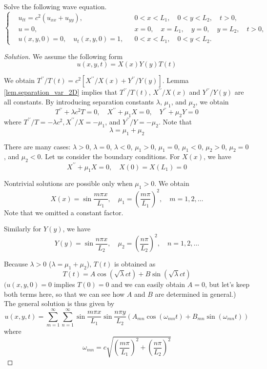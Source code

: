\begin{example}[]
Solve the following wave equation.
$$
\left\{\begin{aligned}
&u_{t t}=c^2\left(u_{x x}+u_{y y}\right), && 0<x<L_1, \quad 0<y<L_2, \quad t>0, 
\\
&u=0, && x=0, \quad x=L_1, \quad y=0, \quad y=L_2, \quad t>0, 
\\
&u(x, y, 0)=0, \quad u_t(x, y, 0)=1, && 0<x<L_1, \quad 0<y<L_2 .
\end{aligned}\right.
$$
\end{example}
\begin{proof}[Solution]
We assume the following form
$$
u(x, y, t)=X(x) Y(y) T(t)
$$

We obtain $T^{\prime \prime} / T(t)=c^2\left[X^{\prime \prime} / X(x)+Y^{\prime \prime} / Y(y)\right]$. Lemma \ref{lem.separation_var_2D} implies that $T^{\prime \prime} / T(t)$, $X^{\prime \prime} / X(x)$ and $Y^{\prime \prime} / Y(y)$ are all constants. By introducing separation constants $\lambda$, $\mu_1$, and $\mu_2$, we obtain
$$
T^{\prime \prime}+\lambda c^2 T=0, \quad X^{\prime \prime}+\mu_1 X=0, \quad Y^{\prime \prime}+\mu_2 Y=0
$$
where $T^{\prime \prime} / T=-\lambda c^2, X^{\prime \prime} / X=-\mu_1$, and $Y^{\prime \prime} / Y=-\mu_2$. Note that
$$
\lambda=\mu_1+\mu_2
$$

There are many cases: $\lambda>0$, $\lambda=0$, $ \lambda<0$, $\mu_1>0$, $\mu_1=0$, $\mu_1<0$, $\mu_2>0$, $\mu_2=0$, and $\mu_2<0$. Let us consider the boundary conditions. For $X(x)$, we have
$$
X^{\prime \prime}+\mu_1 X=0, \quad X(0)=X\left(L_1\right)=0
$$

Nontrivial solutions are possible only when $\mu_1>0$. We obtain
$$
X(x)=\sin \frac{m \pi x}{L_1}, \quad \mu_1=\left(\frac{m \pi}{L_1}\right)^2, \quad m=1,2, \ldots
$$
Note that we omitted a constant factor. 

Similarly for $Y(y)$, we have
$$
Y(y)=\sin \frac{n \pi x}{L_2}, \quad \mu_2=\left(\frac{n \pi}{L_2}\right)^2, \quad n=1,2, \ldots
$$

Because $\lambda>0$ ($\lambda=\mu_1+\mu_2$), $T(t)$ is obtained as
$$
T(t)=A \cos (\sqrt{\lambda} c t)+B \sin (\sqrt{\lambda} c t)
$$
$(u(x, y, 0)=0$ implies $T(0)=0$ and we can easily obtain $A=0$, but let's keep both terms here, so that we can see how $A$ and $B$ are determined in general.) The general solution is thus given by
$$
u(x, y, t)=\sum_{m=1}^{\infty} \sum_{n=1}^{\infty} \sin \frac{m \pi x}{L_1} \sin \frac{n \pi y}{L_2}\left(A_{m n} \cos \left(\omega_{m n} t\right)+B_{m n} \sin \left(\omega_{m n} t\right)\right)
$$
where
$$
\omega_{m n}=c \sqrt{\left(\frac{m \pi}{L_1}\right)^2+\left(\frac{n \pi}{L_2}\right)^2}
$$


\end{proof}
